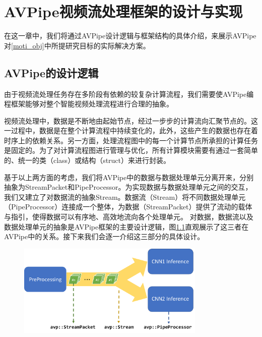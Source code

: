 
\chapter{AVPipe视频流处理框架的设计与实现}
在这一章中，我们将通过AVPipe设计逻辑与框架结构的具体介绍，来展示AVPipe对\ref{moti_obj}中所提研究目标的实际解决方案。
\section{AVPipe的设计逻辑}
由于视频流处理任务存在多阶段有依赖的较复杂计算流程，我们需要使AVPipe编程框架能够对整个智能视频处理流程进行合理的抽象。\par
视频流处理中，数据是不断地由起始节点，经过一步步的计算流向汇聚节点的。这一过程中，数据是在整个计算流程中持续变化的，此外，这些产生的数据也存在着时序上的依赖关系。另一方面，处理流程图中的每一个计算节点所承担的计算任务是固定的。为了对计算流程图进行管理与优化，所有计算模块需要有通过一套简单的、统一的类（class）或结构（struct）来进行封装。\par
基于以上两方面的考虑，我们将AVPipe中的数据与数据处理单元分离开来，分别抽象为StreamPacket和PipeProcessor。为实现数据与数据处理单元之间的交互，我们又建立了对数据流的抽象Stream。数据流（Stream）将不同数据处理单元（PipeProcessor）连接成一个整体，为数据（StreamPacket）提供了流动的载体与指引，使得数据可以有序地、高效地流向各个处理单元。 对数据，数据流以及数据处理单元的抽象是AVPipe框架的主要设计逻辑，图\ref{fig:base_struct}直观展示了这三者在AVPipe中的关系。接下来我们会逐一介绍这三部分的具体设计。
\begin{figure}[htp]
    \centering
    \includegraphics[width=0.8\textwidth]{figure/avp_base_struct.pdf}
    \label{fig:base_struct}
\end{figure}
